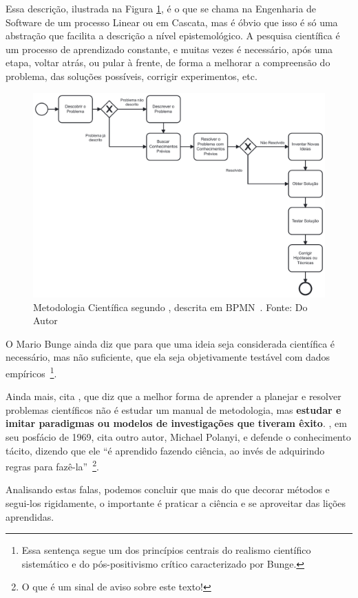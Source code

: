 Essa descrição, ilustrada na Figura \ref{fig:bunge}, é o que se chama na Engenharia de Software de um processo Linear ou em Cascata, mas é óbvio que isso é só uma abstração que facilita a descrição a nível epistemológico. A pesquisa científica é um processo de aprendizado constante, e muitas vezes é necessário, após uma etapa, voltar atrás, ou pular à frente, de forma a melhorar a compreensão do problema, das soluções possíveis, corrigir experimentos, etc.

\begin{figure}[hbt]
    \centering
	\includegraphics[width=0.7\linewidth]{Images/metodologiabunge.pdf}
    \caption{Metodologia Científica segundo \citet{Bunge2002}, descrita em BPMN~\citep{omg2013bpmn}. Fonte: Do Autor}
    \label{fig:bunge}
\end{figure}

O Mario Bunge ainda diz que para que uma ideia seja considerada científica é necessário, mas não suficiente, que ela seja objetivamente testável com dados empíricos~\citep[p. 37]{Bunge2002}\footnote{Essa sentença segue um dos princípios centrais do realismo científico sistemático e do pós-positivismo crítico caracterizado por Bunge.}.

Ainda mais, \citet[p. 40]{Bunge2002} cita \citet{Kuhn1970}, que diz que a melhor forma de aprender a planejar e resolver problemas científicos não é estudar um manual de metodologia, mas \textbf{estudar e imitar paradigmas ou modelos de investigações que tiveram êxito}. \citet{Kuhn2018}, em seu posfácio de 1969, cita outro autor, Michael Polanyi,  e defende o conhecimento tácito,  dizendo que ele ``é aprendido fazendo ciência, ao invés de adquirindo regras para fazê-la''~\citep[p. 160]{Kuhn2018}\footnote{O que é um sinal de aviso sobre este texto!}. 

Analisando estas falas, podemos concluir que mais do que decorar métodos e segui-los rigidamente, o importante é praticar a ciência e se aproveitar das lições aprendidas.

